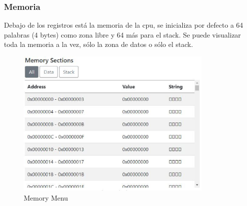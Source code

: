 {{            %

        }

        \newpage
        \subsubsection{Memoria}
        {
            Debajo de los registros está la memoria de la cpu, se inicializa por defecto a 64 palabras (4 bytes)
            como zona libre y 64 más para el stack. Se puede visualizar toda la memoria a la vez, sólo la zona de datos o sólo el stack.

            \begin{figure}[h]
                \centering
                \includegraphics[width=0.85\textwidth]{images/memory}
                \caption{Memory Menu}
            \end{figure}

}}
